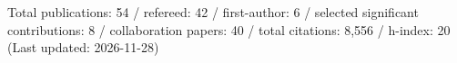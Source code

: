 Total publications: 54 / refereed: 42 / first-author: 6 / selected significant contributions: 8 / collaboration papers: 40 / total citations: 8,556 / h-index: 20 (Last updated: 2026-11-28)